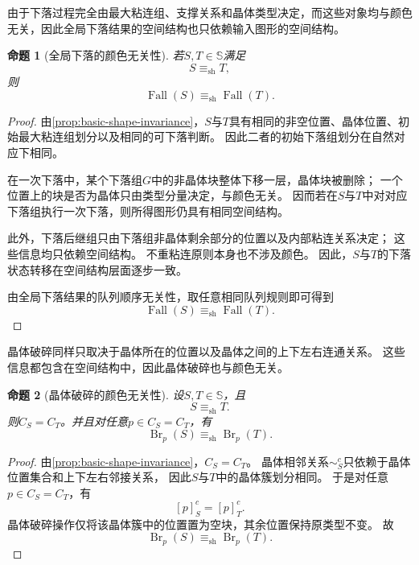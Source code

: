 \documentclass[UTF8,fontset=none]{ctexart}
\theoremstyle{cnthm}
\newtheorem{proposition}{命题}[section]
\begin{document}
			由于下落过程完全由最大粘连组、支撑关系和晶体类型决定，而这些对象均与颜色无关，因此全局下落结果的空间结构也只依赖输入图形的空间结构。
			
			\begin{proposition}[全局下落的颜色无关性]\label{prop:fall-shape-invariance}
				若$S,T\in\mathbb{S}$满足
				$$
				S\equiv_{\mathrm{sh}}T,
				$$
				则
				$$
				\operatorname{Fall}(S)
				\equiv_{\mathrm{sh}}
				\operatorname{Fall}(T).
				$$
			\end{proposition}
			
			\begin{proof}
				由\cref{prop:basic-shape-invariance}，$S$与$T$具有相同的非空位置、晶体位置、初始最大粘连组划分以及相同的可下落判断。
				因此二者的初始下落组划分在自然对应下相同。
				
				在一次下落中，某个下落组$G$中的非晶体块整体下移一层，晶体块被删除；
				一个位置上的块是否为晶体只由类型分量决定，与颜色无关。
				因而若在$S$与$T$中对对应下落组执行一次下落，则所得图形仍具有相同空间结构。
				
				此外，下落后继组只由下落组非晶体剩余部分的位置以及内部粘连关系决定；
				这些信息均只依赖空间结构。
				不重粘连原则本身也不涉及颜色。
				因此，$S$与$T$的下落状态转移在空间结构层面逐步一致。
				
				由全局下落结果的队列顺序无关性，取任意相同队列规则即可得到
				$$
				\operatorname{Fall}(S)
				\equiv_{\mathrm{sh}}
				\operatorname{Fall}(T).
				$$
			\end{proof}
			
			晶体破碎同样只取决于晶体所在的位置以及晶体之间的上下左右连通关系。
			这些信息都包含在空间结构中，因此晶体破碎也与颜色无关。
			
			\begin{proposition}[晶体破碎的颜色无关性]\label{prop:break-shape-invariance}
				设$S,T\in\mathbb{S}$，且
				$$
				S\equiv_{\mathrm{sh}}T.
				$$
				则$C_S=C_T$。并且对任意$p\in C_S=C_T$，有
				$$
				\operatorname{Br}_p(S)
				\equiv_{\mathrm{sh}}
				\operatorname{Br}_p(T).
				$$
			\end{proposition}
			
			\begin{proof}
				由\cref{prop:basic-shape-invariance}，$C_S=C_T$。
				晶体相邻关系$\sim_S^c$只依赖于晶体位置集合和上下左右邻接关系，
				因此$S$与$T$中的晶体簇划分相同。
				于是对任意$p\in C_S=C_T$，有
				$$
				[p]^c_S=[p]^c_T.
				$$
				晶体破碎操作仅将该晶体簇中的位置置为空块，其余位置保持原类型不变。
				故
				$$
				\operatorname{Br}_p(S)
				\equiv_{\mathrm{sh}}
				\operatorname{Br}_p(T).
				$$
			\end{proof}
			
\end{document}
